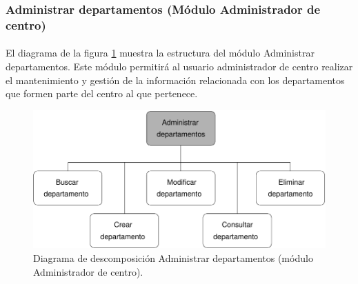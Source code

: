 \subsubsection{Administrar departamentos (Módulo Administrador de centro)}

  \paragraph{}El diagrama de la figura
  \ref{diagramaDescomposicionAdministrarDepartamentos-admCentro} muestra la
  estructura del módulo Administrar departamentos. Este módulo permitirá al
  usuario administrador de centro realizar el mantenimiento y gestión de la
  información relacionada con los departamentos que formen parte del centro al
  que pertenece.

  \begin{figure}[!ht]
    \begin{center}
      \includegraphics[]{11.Disenyo_Arquitectonico/11.2.Diagramas_Descomposicion/11.2.3.Modulo_administrador_centro/AdministrarBBDD/AdministrarDepartamentos/Diagramas/administrar_departamentos.pdf}
      \caption{Diagrama de descomposición Administrar departamentos (módulo Administrador de centro).}
      \label{diagramaDescomposicionAdministrarDepartamentos-admCentro}
    \end{center}
  \end{figure}
